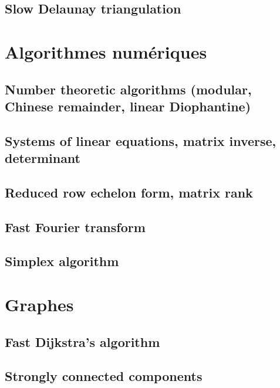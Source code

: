\documentclass[12pt]{article}
\begin{document}
\subsection{Slow Delaunay triangulation}
{\scriptsize}

\section{Algorithmes numériques}

\subsection{Number theoretic algorithms (modular, Chinese remainder, linear Diophantine)}
{\scriptsize}

\subsection{Systems of linear equations, matrix inverse, determinant}
{\scriptsize}

\subsection{Reduced row echelon form, matrix rank}
{\scriptsize}

\subsection{Fast Fourier transform}
{\scriptsize}

\subsection{Simplex algorithm}
{\scriptsize}

\section{Graphes}

\subsection{Fast Dijkstra's algorithm}
{\scriptsize}

\subsection{Strongly connected components}
{\scriptsize}
\end{document}
